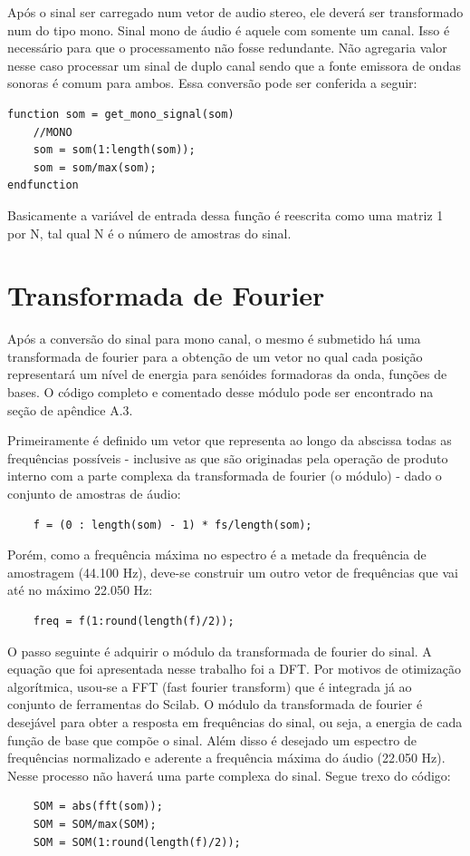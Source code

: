 Após o sinal ser carregado num vetor de audio stereo, ele deverá ser transformado num do tipo mono. Sinal mono de áudio é aquele com somente um canal. Isso é necessário para que o processamento não fosse redundante. Não agregaria valor nesse caso processar um sinal de duplo canal sendo que a fonte emissora de ondas sonoras é comum para ambos. Essa conversão pode ser conferida a seguir:
\begin{lstlisting} 
function som = get_mono_signal(som)
	//MONO
	som = som(1:length(som));
	som = som/max(som);
endfunction
\end{lstlisting}

Basicamente a variável de entrada dessa função é reescrita como uma matriz 1 por N, tal qual N é o número de amostras do sinal.

\section{Transformada de Fourier}
\label{sec:transformada}

Após a conversão do sinal para mono canal, o mesmo é submetido há uma transformada de fourier para a obtenção de um vetor no qual cada posição representará um nível de energia para senóides formadoras da onda, funções de bases. O código completo e comentado desse módulo pode ser encontrado na seção de apêndice A.3. 

Primeiramente é definido um vetor que representa ao longo da abscissa todas as frequências possíveis - inclusive as que são originadas pela operação de produto interno com a parte complexa da transformada de fourier (o módulo) - dado o conjunto de amostras de áudio:
\begin{lstlisting} 
	f = (0 : length(som) - 1) * fs/length(som);
\end{lstlisting}

Porém, como a frequência máxima no espectro é a metade da frequência de amostragem (44.100 Hz), deve-se construir um outro vetor de frequências que vai até no máximo 22.050 Hz: 
\begin{lstlisting} 
	freq = f(1:round(length(f)/2));
\end{lstlisting} 

O passo seguinte é adquirir o módulo da transformada de fourier do sinal. A equação que foi apresentada nesse trabalho foi a DFT. Por motivos de otimização algorítmica, usou-se a FFT (fast fourier transform) que é integrada já ao conjunto de ferramentas do Scilab. O módulo da transformada de fourier é desejável para obter a resposta em frequências do sinal, ou seja, a energia de cada função de base que compõe o sinal. Além disso é desejado um espectro de frequências normalizado e aderente a frequência máxima do áudio (22.050 Hz). Nesse processo não haverá uma parte complexa do sinal. Segue trexo do código:  
\begin{lstlisting} 
	SOM = abs(fft(som));
	SOM = SOM/max(SOM);
	SOM = SOM(1:round(length(f)/2));
\end{lstlisting}

